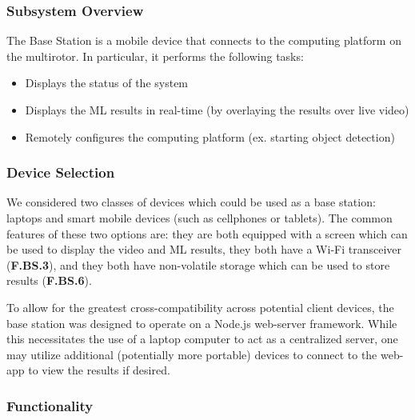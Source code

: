 \subsubsection{Subsystem Overview}

The Base Station is a mobile device that connects to the computing platform on the multirotor. In particular, it performs the following tasks:
\begin{itemize}
    \item Displays the status of the system
    \item Displays the ML results in real-time (by overlaying the results over live video)
    \item Remotely configures the computing platform (ex. starting object detection)
\end{itemize}

\subsubsection{Device Selection}
We considered two classes of devices which could be used as a base station: laptops and smart mobile devices (such as cellphones or tablets). The common features of these two options are: they are both equipped with a screen which can be used to display the video and ML results, they both have a Wi-Fi transceiver (\textbf{F.BS.3}), and they both have non-volatile storage which can be used to store results (\textbf{F.BS.6}).

To allow for the greatest cross-compatibility across potential client devices, the base station was designed to operate on a Node.js web-server framework. While this necessitates the use of a laptop computer to act as a centralized server, one may utilize additional (potentially more portable) devices to connect to the web-app to view the results if desired.

\subsubsection{Functionality}

